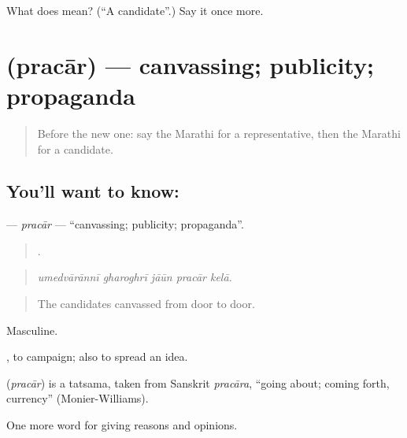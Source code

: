 \begin{tcolorbox}[breakable,colback=teal!4,colframe=teal!35!black,title={Before you move on}]
What does  mean? (\textquotedblleft{}A candidate\textquotedblright{}.) Say it once more.
\end{tcolorbox}
\section[\texorpdfstring{\mr{प्रचार} (pracār)}{प्रचार (pracār)}]{ (pracār) — canvassing; publicity; propaganda}

\label{lesson:MR-C355-pracar}



\begin{quote}
Before the new one: say the Marathi for a representative, then the Marathi for a candidate.
\end{quote}

\subsection*{You'll want to know: }
\textbf{} — \emph{pracār} — \textquotedblleft{}canvassing; publicity; propaganda\textquotedblright{}.

\begin{quote}
    .
\end{quote}

\begin{quote}
\emph{umedvārānnī gharoghrī jāūn pracār kelā.}
\end{quote}

\begin{quote}
The candidates canvassed from door to door.
\end{quote}

Masculine.

 , to campaign; also to spread an idea.

\begin{cousinweb}
\textbf{} (\emph{pracār}) is a tatsama, taken from Sanskrit \emph{pracāra}, \textquotedblleft{}going about; coming forth, currency\textquotedblright{} (Monier-Williams).
\end{cousinweb}

\begin{grammarlens}[title={What you've built}]
One more word for giving reasons and opinions.
\end{grammarlens}

